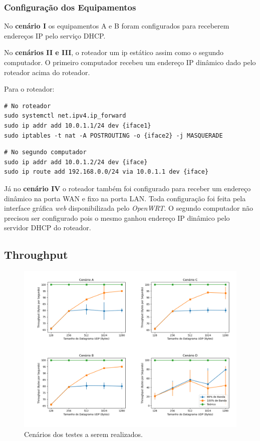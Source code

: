 

\subsubsection{Configuração dos Equipamentos}
No \textbf{cenário I} os equipamentos A e B foram configurados para receberem endereços \ac{IP} pelo serviço \ac{DHCP}.  

No \textbf{cenários II e III}, o roteador um ip estático assim como o segundo computador. O primeiro computador recebeu um endereço \ac{IP} dinâmico dado pelo roteador acima do roteador. 

Para o roteador: 

\begin{verbatim}
# No roteador
sudo systemctl net.ipv4.ip_forward 
sudo ip addr add 10.0.1.1/24 dev {iface1} 
sudo iptables -t nat -A POSTROUTING -o {iface2} -j MASQUERADE 
\end{verbatim}

\begin{verbatim}
# No segundo computador
sudo ip addr add 10.0.1.2/24 dev {iface}
sudo ip route add 192.168.0.0/24 via 10.0.1.1 dev {iface}
\end{verbatim}

Já no \textbf{cenário IV} o roteador também foi configurado para receber um endereço dinâmico na porta \ac{WAN} e fixo na porta \ac{LAN}. Toda configuração foi feita pela interface gráfica \textit{web} disponibilizada pelo \textit{OpenWRT}. O segundo computador não precisou ser configurado pois o mesmo ganhou endereço \ac{IP} dinâmico pelo servidor \ac{DHCP} do roteador.


\subsection{Throughput}


\begin{figure}[H]
    \centering
    \includegraphics[width=0.9\linewidth]{sources/fig-throughput.png}
    \caption{Cenários dos testes a serem realizados.}
    \label{fig:cenarios}
\end{figure}




